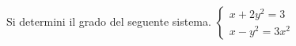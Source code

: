 Si determini il grado del seguente sistema.
$\displaystyle
\left\{
\begin{array}{l}
\displaystyle x + 2y^2 = 3 \\
\displaystyle x-y^2 = 3x^2
\end{array}
\right.
$

